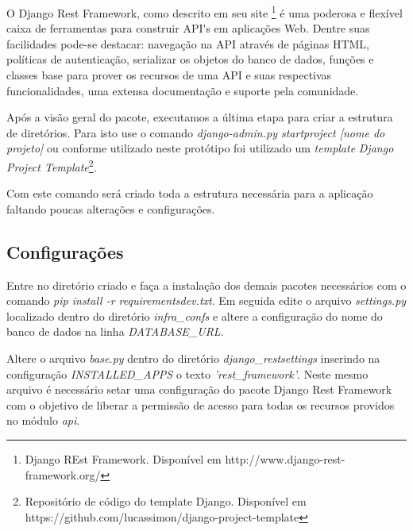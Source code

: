   O Django Rest Framework, como descrito em seu site \footnote[10]{Django REst Framework. Disponível em http://www.django-rest-framework.org/} é uma poderosa
  e flexível caixa de ferramentas para construir API\'{}s em aplicações Web. Dentre suas facilidades pode-se destacar: navegação na API através
  de páginas HTML, políticas de autenticação, serializar os objetos do banco de dados, funções e classes base para prover os recursos
  de uma API e suas respectivas funcionalidades, uma extensa documentação e suporte pela comunidade.
  
  Após a visão geral do pacote, executamos a última etapa para criar a estrutura de diretórios. Para isto use o comando
  \textit{django-admin.py startproject [nome do projeto] } ou conforme utilizado neste protótipo foi utilizado um \textit{template}
  \textit{Django Project Template}\footnote[11]{Repositório de código do template Django. Disponível em https://github.com/lucassimon/django-project-template}.
  
  Com este comando será criado toda a estrutura necessária para a aplicação faltando poucas alterações e configurações.
  
\subsection{Configurações}

  Entre no diretório criado e faça a instalação dos demais pacotes necessários com o comando \textit{pip install -r requirements\/dev.txt}.
  Em seguida edite o arquivo \textit{settings.py} localizado dentro do diretório \textit{infra\_confs\/} e altere a configuração
  do nome do banco de dados na linha \textit{DATABASE\_URL}.
  
  Altere o arquivo \textit{base.py} dentro do diretório \textit{django\_rest\/settings\/} inserindo na configuração \textit{INSTALLED\_APPS}
  o texto \textit{'rest\_framework'}. Neste mesmo arquivo é necessário setar uma configuração do pacote Django Rest Framework
  com o objetivo de liberar a permissão de acesso para todas os recursos providos no módulo \textit{api}.
  
